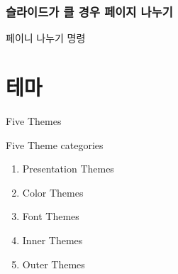 \documentclass[ aspectratio=169,  10pt,blue,xcolor=pdftex,dvipsnames,table,handout,notes]{beamer}
\begin{document}

		\begin{frame}[c]
		\frametitle{슬라이드가 클 경우 페이지 나누기}

			\begin{block} {페이니 나누기 명령}
			\end{block}


		\end{frame}





















		\section{테마}

		\begin{frame}[plain]
		\centering
		\end{frame}



		\begin{frame}[t]{Five Themes}

			\begin{block} {Five Theme categories}
			\begin{enumerate}
			\item Presentation Themes
			\item Color Themes
			\item Font Themes
			\item Inner Themes
			\item Outer Themes
			\end{enumerate}
			\end{block}

		\end{frame}
\end{document}
